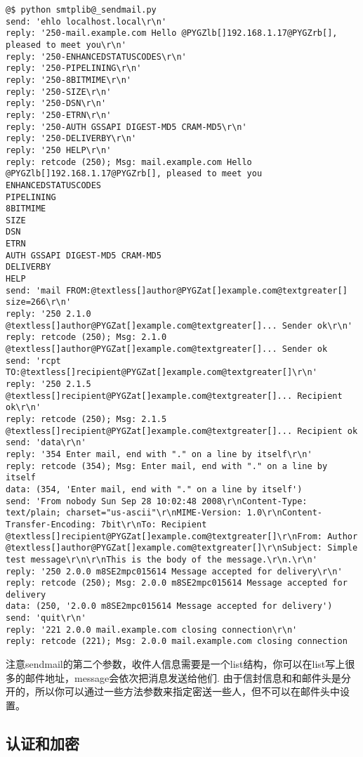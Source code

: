 \documentclass[a4paper,10pt,english]{manual}
\begin{document}
\begin{Verbatim}[commandchars=@\[\]]
@$ python smtplib@_sendmail.py
send: 'ehlo localhost.local\r\n'
reply: '250-mail.example.com Hello @PYGZlb[]192.168.1.17@PYGZrb[], pleased to meet you\r\n'
reply: '250-ENHANCEDSTATUSCODES\r\n'
reply: '250-PIPELINING\r\n'
reply: '250-8BITMIME\r\n'
reply: '250-SIZE\r\n'
reply: '250-DSN\r\n'
reply: '250-ETRN\r\n'
reply: '250-AUTH GSSAPI DIGEST-MD5 CRAM-MD5\r\n'
reply: '250-DELIVERBY\r\n'
reply: '250 HELP\r\n'
reply: retcode (250); Msg: mail.example.com Hello @PYGZlb[]192.168.1.17@PYGZrb[], pleased to meet you
ENHANCEDSTATUSCODES
PIPELINING
8BITMIME
SIZE
DSN
ETRN
AUTH GSSAPI DIGEST-MD5 CRAM-MD5
DELIVERBY
HELP
send: 'mail FROM:@textless[]author@PYGZat[]example.com@textgreater[] size=266\r\n'
reply: '250 2.1.0 @textless[]author@PYGZat[]example.com@textgreater[]... Sender ok\r\n'
reply: retcode (250); Msg: 2.1.0 @textless[]author@PYGZat[]example.com@textgreater[]... Sender ok
send: 'rcpt TO:@textless[]recipient@PYGZat[]example.com@textgreater[]\r\n'
reply: '250 2.1.5 @textless[]recipient@PYGZat[]example.com@textgreater[]... Recipient ok\r\n'
reply: retcode (250); Msg: 2.1.5 @textless[]recipient@PYGZat[]example.com@textgreater[]... Recipient ok
send: 'data\r\n'
reply: '354 Enter mail, end with "." on a line by itself\r\n'
reply: retcode (354); Msg: Enter mail, end with "." on a line by itself
data: (354, 'Enter mail, end with "." on a line by itself')
send: 'From nobody Sun Sep 28 10:02:48 2008\r\nContent-Type: text/plain; charset="us-ascii"\r\nMIME-Version: 1.0\r\nContent-Transfer-Encoding: 7bit\r\nTo: Recipient @textless[]recipient@PYGZat[]example.com@textgreater[]\r\nFrom: Author @textless[]author@PYGZat[]example.com@textgreater[]\r\nSubject: Simple test message\r\n\r\nThis is the body of the message.\r\n.\r\n'
reply: '250 2.0.0 m8SE2mpc015614 Message accepted for delivery\r\n'
reply: retcode (250); Msg: 2.0.0 m8SE2mpc015614 Message accepted for delivery
data: (250, '2.0.0 m8SE2mpc015614 Message accepted for delivery')
send: 'quit\r\n'
reply: '221 2.0.0 mail.example.com closing connection\r\n'
reply: retcode (221); Msg: 2.0.0 mail.example.com closing connection
\end{Verbatim}

注意sendmail的第二个参数，收件人信息需要是一个list结构，你可以在list写上很多的邮件地址，message会依次把消息发送给他们. 由于信封信息和和邮件头是分开的，所以你可以通过一些方法参数来指定密送一些人，但不可以在邮件头中设置。


\subsection{认证和加密}
\end{document}
